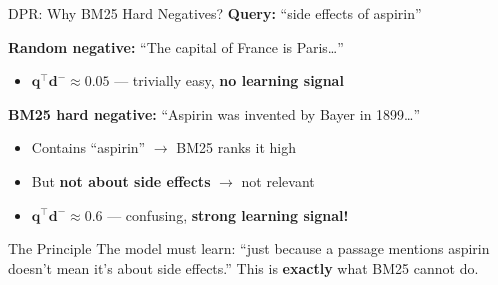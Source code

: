 \documentclass[aspectratio=169]{beamer}
\newif\ifanimated
\newcommand{\cpause}{\ifanimated\pause\fi}
\newcommand{\vq}{\mathbf{q}}
\newcommand{\vd}{\mathbf{d}}
\begin{document}
\begin{frame}{DPR: Why BM25 Hard Negatives?}
\textbf{Query:} ``side effects of aspirin''

\vspace{1em}

\textbf{Random negative:} ``The capital of France is Paris\ldots''
\begin{itemize}
    \item $\vq^\top \vd^- \approx 0.05$ --- trivially easy, \textbf{no learning signal}
\end{itemize}

\cpause
\vspace{0.5em}

\textbf{BM25 hard negative:} ``Aspirin was invented by Bayer in 1899\ldots''
\begin{itemize}
    \item Contains ``aspirin'' $\to$ BM25 ranks it high
    \item But \textbf{not about side effects} $\to$ not relevant
    \item $\vq^\top \vd^- \approx 0.6$ --- confusing, \textbf{strong learning signal!}
\end{itemize}

\cpause
\vspace{1em}

\begin{alertblock}{The Principle}
The model must learn: ``just because a passage mentions aspirin doesn't mean it's about side effects.'' This is \textbf{exactly} what BM25 cannot do.
\end{alertblock}
\end{frame}
\end{document}
